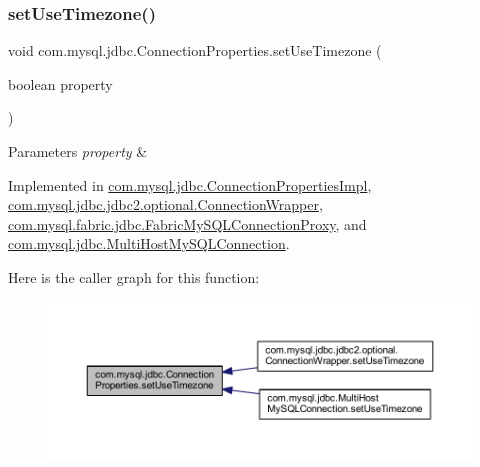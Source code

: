 \subsubsection{\texorpdfstring{set\+Use\+Timezone()}{setUseTimezone()}}
{\footnotesize\ttfamily void com.\+mysql.\+jdbc.\+Connection\+Properties.\+set\+Use\+Timezone (\begin{DoxyParamCaption}\item[{boolean}]{property }\end{DoxyParamCaption})}


\begin{DoxyParams}{Parameters}
{\em property} & \\
\hline
\end{DoxyParams}


Implemented in \mbox{\hyperlink{classcom_1_1mysql_1_1jdbc_1_1_connection_properties_impl_ad035c0773944baefb17d901bc0915c81}{com.\+mysql.\+jdbc.\+Connection\+Properties\+Impl}}, \mbox{\hyperlink{classcom_1_1mysql_1_1jdbc_1_1jdbc2_1_1optional_1_1_connection_wrapper_aceb697ff05de0e9bcd43256ff2a7d47a}{com.\+mysql.\+jdbc.\+jdbc2.\+optional.\+Connection\+Wrapper}}, \mbox{\hyperlink{classcom_1_1mysql_1_1fabric_1_1jdbc_1_1_fabric_my_s_q_l_connection_proxy_a8c2d55fb2a8a7a5359885db34813c5dc}{com.\+mysql.\+fabric.\+jdbc.\+Fabric\+My\+S\+Q\+L\+Connection\+Proxy}}, and \mbox{\hyperlink{classcom_1_1mysql_1_1jdbc_1_1_multi_host_my_s_q_l_connection_a3854f7fb3b5d199edae3890e38bf9b7c}{com.\+mysql.\+jdbc.\+Multi\+Host\+My\+S\+Q\+L\+Connection}}.

Here is the caller graph for this function\+:\nopagebreak
\begin{figure}[H]
\begin{center}
\leavevmode
\includegraphics[width=350pt]{interfacecom_1_1mysql_1_1jdbc_1_1_connection_properties_a7f57a800fefe86a58c1ddfe7fd7d8ef2_icgraph}
\end{center}
\end{figure}
\mbox{\label{interfacecom_1_1mysql_1_1jdbc_1_1_connection_properties_af0a84465de479a1eea05763a2ae4cc37}} 
